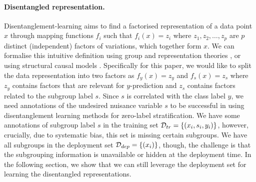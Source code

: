 \paragraph{Disentangled representation.}
Disentanglement-learning aims to find a factorised representation of a data point $x$ through mapping functions $f_i$ such that $f_i(x)=z_i$ where $z_1,z_2,\ldots,z_p$ are $p$ distinct (independent) factors of variations, which together form $x$.
%
We can formalise this intuitive definition using group and representation theories \citep{HigAmoPfaRacetal18}, or using structural causal models \citep{SutMilSchBau19}.
%
Specifically for this paper, we would like to split the data representation into two factors as $f_y(x)=z_y$ and $f_s(x)=z_s$ where $z_y$ contains factors that are relevant for $y$-prediction and $z_s$ contains factors related to the subgroup label $s$.
%
Since $s$ is correlated with the class label $y$, we need annotations of the undesired nuisance variable $s$ \citep{jaiswal2018unsupervised,JaiWuAbdNat19} to be successful in using disentanglement learning methods for zero-label stratification. %
%
We have some annotations of subgroup label $s$ in the training set ${\mathcal{D}}_{tr} =\{(x_i, s_i, y_i)\}$, however, crucially, due to systematic bias, this set is missing certain subgroups.
%
We have all subgroups in the deployment set ${\mathcal{D}}_{dep} =\{(x_i)\}$, 
though, the challenge is that the subgrouping information is unavailable or hidden at the deployment time.
%
In the following section, we show that we can still leverage the 
deployment set for learning the disentangled representations.

